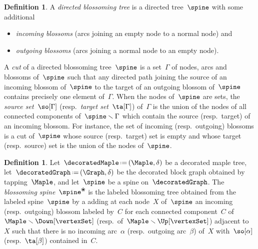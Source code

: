 \documentclass{amsart}
\theoremstyle{definition}
\newtheorem{definition}[theorem]{Definition}
\newcommand{\ssm}{\smallsetminus} %
\newcommand{\eqdef}{\mbox{\,\raisebox{0.2ex}{\scriptsize\ensuremath{\mathrm:}}\ensuremath{=}\,}} %
\newcommand{\darkblue}{\color{darkblue}} %
\newcommand{\defn}[1]{\textsl{\darkblue #1}} %
\newcommand{\decoration}{\delta}
\newcommand{\blossom}{\text{\ding{96}}} %
\begin{document}
\begin{definition}
  \label{def:blossomingTree}
  A \defn{directed blossoming tree} is a directed tree~$\spine$ with some additional 
  \begin{itemize}
    \item \defn{incoming blossoms} (arcs joining an empty node to a normal node) and 
    \item \defn{outgoing blossoms} (arcs joining a normal node to an empty node).
  \end{itemize}
  A \defn{cut} of a directed blossoming tree~$\spine$ is a set~$\Gamma$ of nodes, arcs and blossoms of~$\spine$ such that any directed path joining the source of an incoming blossom of~$\spine$ to the target of an outgoing blossom of~$\spine$ contains precisely one element of~$\Gamma$.
  When the nodes of~$\spine$ are sets, the \defn{source set}~$\so[\Gamma]$ (resp.~\defn{target set}~$\ta[\Gamma]$) of~$\Gamma$ is the union of the nodes of all connected components of~$\spine \ssm \Gamma$ which contain the source (resp.~target) of an incoming blossom.
  For instance, the set of incoming (resp.~outgoing) blossoms is a cut of~$\spine$ whose source (resp.~target) set is empty and whose target (resp.~source) set is the union of the nodes of~$\spine$.
\end{definition}

\begin{definition}
  \label{def:blossomingSpine}
  Let~$\decoratedMaple \eqdef (\Maple, \decoration)$ be a decorated maple tree, let~$\decoratedGraph \eqdef (\Graph, \decoration)$ be the decorated block graph obtained by tapping~$\Maple$, and let~$\spine$ be a spine on~$\decoratedGraph$.
  The \defn{blossoming spine}~$\spine^\blossom$ is the labeled blossoming tree obtained from the labeled spine~$\spine$ by a adding at each node~$X$ of~$\spine$ an incoming (resp.~outgoing) blossom labeled by~$C$ for each connected component~$C$ of~$\Maple \ssm \Down[\vertexSet]$ (resp.~of~$\Maple \ssm \Up[\vertexSet]$) adjacent to~$X$ such that there is no incoming arc~$\alpha$ (resp.~outgoing arc~$\beta$) of~$X$ with~$\so[\alpha]$ (resp.~$\ta[\beta]$) contained in~$C$.
\end{definition}
\end{document}

